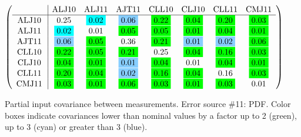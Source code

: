 \begin{table}[H]
\scriptsize
\begin{center}
\renewcommand{\arraystretch}{1.1}
\begin{math}\left(\begin{array}{c|ccccccc}
 & \mathrm{ALJ10} & 
\mathrm{ALJ11} & 
\mathrm{AJT11} & 
\mathrm{CLL10} & 
\mathrm{CLJ10} & 
\mathrm{CLL11} & 
\mathrm{CMJ11} \\
\hline
\mathrm{ALJ10} \hspace*{2pt} &       0.25 &  \colorbox{Cyan1}{$      0.02$} &  \colorbox{SkyBlue1}{$      0.06$} &  \colorbox{Green1}{$      0.22$} &  \colorbox{Green1}{$      0.04$} &  \colorbox{Green1}{$      0.20$} &  \colorbox{Green1}{$      0.03$} \\
\mathrm{ALJ11} \hspace*{2pt} &  \colorbox{Cyan1}{$      0.02$} &       0.01 &  \colorbox{Green1}{$      0.05$} &  \colorbox{Green1}{$      0.05$} &  \colorbox{Green1}{$      0.01$} &  \colorbox{Green1}{$      0.04$} &  \colorbox{Green1}{$      0.01$} \\
\mathrm{AJT11} \hspace*{2pt} &  \colorbox{SkyBlue1}{$      0.06$} &  \colorbox{Green1}{$      0.05$} &       0.36 &  \colorbox{Green1}{$      0.21$} &  \colorbox{SkyBlue1}{$      0.01$} &  \colorbox{SkyBlue1}{$      0.02$} &  \colorbox{Green1}{$      0.06$} \\
\mathrm{CLL10} \hspace*{2pt} &  \colorbox{Green1}{$      0.22$} &  \colorbox{Green1}{$      0.05$} &  \colorbox{Green1}{$      0.21$} &       0.25 &  \colorbox{Green1}{$      0.04$} &  \colorbox{Green1}{$      0.16$} &  \colorbox{Green1}{$      0.03$} \\
\mathrm{CLJ10} \hspace*{2pt} &  \colorbox{Green1}{$      0.04$} &  \colorbox{Green1}{$      0.01$} &  \colorbox{SkyBlue1}{$      0.01$} &  \colorbox{Green1}{$      0.04$} &       0.01 &  \colorbox{Green1}{$      0.04$} &  \colorbox{Green1}{$      0.01$} \\
\mathrm{CLL11} \hspace*{2pt} &  \colorbox{Green1}{$      0.20$} &  \colorbox{Green1}{$      0.04$} &  \colorbox{SkyBlue1}{$      0.02$} &  \colorbox{Green1}{$      0.16$} &  \colorbox{Green1}{$      0.04$} &       0.16 &  \colorbox{Green1}{$      0.03$} \\
\mathrm{CMJ11} \hspace*{2pt} &  \colorbox{Green1}{$      0.03$} &  \colorbox{Green1}{$      0.01$} &  \colorbox{Green1}{$      0.06$} &  \colorbox{Green1}{$      0.03$} &  \colorbox{Green1}{$      0.01$} &  \colorbox{Green1}{$      0.03$} &       0.01 \\
\end{array}\right)\end{math}
\caption{Partial input covariance between measurements. Error source \#11: PDF. Color boxes indicate covariances lower than nominal values by a factor up to 2 (green), up to 3 (cyan) or greater than 3 (blue).}
\renewcommand{\arraystretch}{1}
\end{center}
\end{table}
